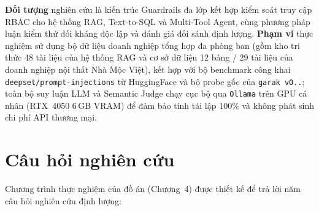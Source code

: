 \textbf{Đối tượng} nghiên cứu là kiến trúc Guardrails đa lớp kết hợp kiểm soát truy cập RBAC cho hệ thống RAG, Text-to-SQL và Multi-Tool Agent, cùng phương pháp luận kiểm thử đối kháng độc lập và đánh giá đối sánh định lượng. \textbf{Phạm vi} thực nghiệm sử dụng bộ dữ liệu doanh nghiệp tổng hợp đa phòng ban (gồm kho tri thức 48 tài liệu của hệ thống RAG và cơ sở dữ liệu 12 bảng / 29 tài liệu của doanh nghiệp nội thất Nhà Mộc Việt), kết hợp với bộ benchmark công khai \texttt{deepset/\allowbreak prompt-\allowbreak injections} từ HuggingFace và bộ probe gốc của \texttt{garak v0..}; toàn bộ suy luận LLM và Semantic Judge chạy cục bộ qua \texttt{Ollama} trên GPU cá nhân (RTX~4050 6\,GB VRAM) để đảm bảo tính tái lập 100\% và không phát sinh chi phí API thương mại.

\section*{Câu hỏi nghiên cứu}

Chương trình thực nghiệm của đồ án (Chương~4) được thiết kế để trả lời năm câu hỏi nghiên cứu định lượng:


